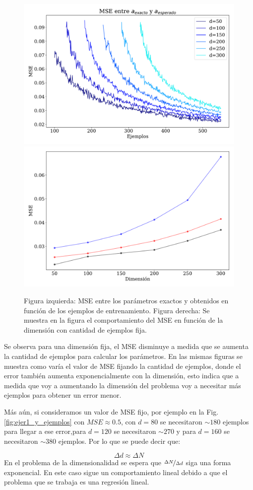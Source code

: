 \begin{figure}[H]
    \centering
    \includegraphics[width=0.495\linewidth]{plots/ejer_1_mse_a_ejemplos.pdf}%
    \hfill
    \includegraphics[width=0.495\linewidth]{plots/ejer_1_mse_a_ejemplos_fijo.pdf}
    \caption{Figura izquierda: MSE entre los parámetros exactos y obtenidos en función de los ejemplos de entrenamiento. Figura  derecha: Se muestra en la figura el comportamiento del MSE en función de la dimensión con cantidad de ejemplos fija.}
    \label{fig:ejer1_a_ejemplos}
\end{figure}

Se observa  para una dimensión fija, el MSE disminuye a medida que se aumenta la cantidad de ejemplos para calcular los parámetros. En las mismas figuras se muestra como varía el valor de MSE fijando la cantidad de ejemplos, donde el error también aumenta exponencialmente con la dimensión, esto indica que a medida que voy a aumentando la dimensión del problema voy a necesitar más ejemplos para obtener un error menor. 

Más aún, si consideramos un valor de MSE fijo, por ejemplo en la Fig.\ref{fig:ejer1_y_ejemplos} con $MSE\approx 0.5$, con $d=80$ se necesitaron $\sim 180$ ejemplos para llegar a ese error,para  $d=120$ se necesitaron $\sim 270$ y para $d=160$ se necesitaron $\sim 380$  ejemplos. Por lo que se puede decir que:

\begin{equation}
    \Delta d \approx \Delta N  
\end{equation}
En el problema  de la dimensionalidad se espera que $\nicefrac{\Delta N}{\Delta d}$ siga una forma exponencial. En este caso sigue un comportamiento lineal debido a que el problema que se trabaja es una regresión lineal. 




